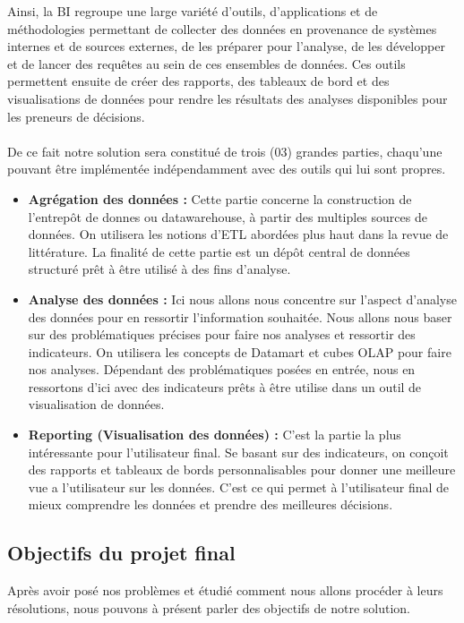 Ainsi, la BI regroupe une large variété d’outils, d’applications et de méthodologies permettant de collecter des données en provenance de systèmes internes et de sources externes, de les préparer pour l’analyse, de les développer et de lancer des requêtes au sein de ces ensembles de données. Ces outils permettent ensuite de créer des rapports, des tableaux de bord et des visualisations de données pour rendre les résultats des analyses disponibles pour les preneurs de décisions.
\paragraph{}

De ce fait notre solution sera constitué de trois (03) grandes parties, chaqu’une pouvant être implémentée indépendamment avec des outils qui lui sont propres.  
\begin{itemize}
    \item \textbf{Agrégation des données :} Cette partie concerne la construction de l’entrepôt de donnes ou datawarehouse, à partir des multiples sources de données. On utilisera les notions d’ETL abordées plus haut dans la revue de littérature. La finalité de cette partie est un dépôt central de données structuré prêt à être utilisé à des fins d’analyse.
    \item \textbf{Analyse des données :}  Ici nous allons nous concentre sur l’aspect d’analyse des données pour en ressortir l’information souhaitée. Nous allons nous baser sur des problématiques précises pour faire nos analyses et ressortir des indicateurs. On utilisera les concepts de Datamart et cubes OLAP pour faire nos analyses. Dépendant des problématiques posées en entrée, nous en ressortons d’ici avec des indicateurs prêts à être utilise dans un outil de visualisation de données.
    \item \textbf{Reporting (Visualisation des données) :} C’est la partie la plus intéressante pour l’utilisateur final. Se basant sur des indicateurs, on conçoit des rapports et tableaux de bords personnalisables pour donner une meilleure vue a l’utilisateur sur les données. C’est ce qui permet à l’utilisateur final de mieux comprendre les données et prendre des meilleures décisions.
\end{itemize}


\subsection{Objectifs du projet final}
Après avoir posé nos problèmes et étudié comment nous allons procéder à leurs résolutions, nous pouvons à présent parler des objectifs de notre solution.

